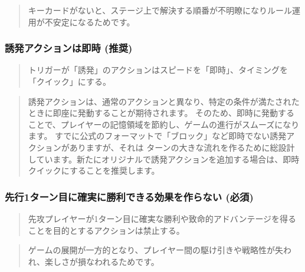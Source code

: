 \documentclass[letterpaper,10pt,dvipdfmx]{sphinxmanual}
\begin{document}
\sphinxAtStartPar
{}
\begin{quote}

\sphinxAtStartPar
キーカードがないと、ステージ上で解決する順番が不明瞭になりルール運用が不安定になるためです。
\end{quote}


\subsubsection{誘発アクションは即時 (推奨)}
\label{\detokenize{appendix/guideline/customRule:id6}}
\sphinxAtStartPar
{}
\begin{quote}

\sphinxAtStartPar
トリガーが「誘発」のアクションはスピードを「即時」、タイミングを「クイック」にする。
\end{quote}

\sphinxAtStartPar
{}
\begin{quote}

\sphinxAtStartPar
誘発アクションは、通常のアクションと異なり、特定の条件が満たされたときに即座に発動することが期待されます。
そのため、即時に発動することで、プレイヤーの記憶領域を節約し、ゲームの進行がスムーズになります。
すでに公式のフォーマットで「ブロック」など即時でない誘発アクションがありますが、それは
ターンの大きな流れを作るために総設計しています。新たにオリジナルで誘発アクションを追加する場合は、即時\sphinxhyphen{}クイックにすることを推奨します。
\end{quote}


\subsubsection{先行1ターン目に確実に勝利できる効果を作らない (必須)}
\label{\detokenize{appendix/guideline/customRule:id7}}
\sphinxAtStartPar
{}
\begin{quote}

\sphinxAtStartPar
先攻プレイヤーが1ターン目に確実な勝利や致命的アドバンテージを得ることを目的とするアクションは禁止する。
\end{quote}

\sphinxAtStartPar
{}
\begin{quote}

\sphinxAtStartPar
ゲームの展開が一方的となり、プレイヤー間の駆け引きや戦略性が失われ、楽しさが損なわれるためです。
\end{quote}
\end{document}
